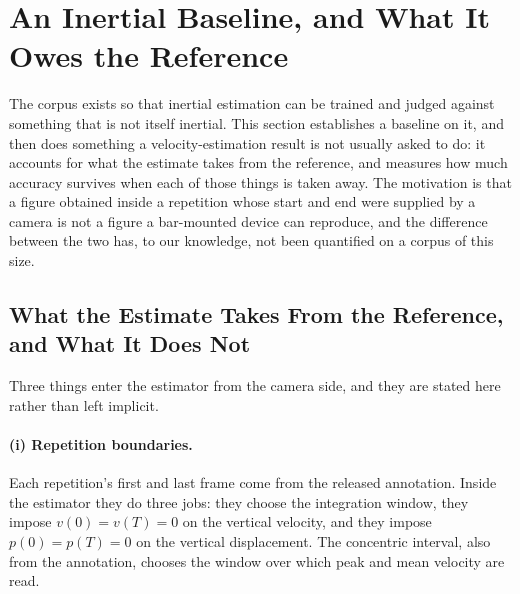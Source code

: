 
\section{An Inertial Baseline, and What It Owes the Reference}\label{sec:imu_baseline}

The corpus exists so that inertial estimation can be trained and judged against something
that is not itself inertial. This section establishes a baseline on it, and then does
something a velocity-estimation result is not usually asked to do: it accounts for what
the estimate takes from the reference, and measures how much accuracy survives when each
of those things is taken away. The motivation is that a figure obtained inside a
repetition whose start and end were supplied by a camera is not a figure a bar-mounted
device can reproduce, and the difference between the two has, to our knowledge, not been
quantified on a corpus of this size.

\subsection{What the Estimate Takes From the Reference, and What It Does Not}
\label{sec:imu_given}

Three things enter the estimator from the camera side, and they are stated here rather
than left implicit.

\paragraph{(i) Repetition boundaries.} Each repetition's first and last frame come from
the released annotation. Inside the estimator they do three jobs: they choose the
integration window, they impose $v(0) = v(T) = 0$ on the vertical velocity, and they
impose $p(0) = p(T) = 0$ on the vertical displacement. The concentric interval, also from
the annotation, chooses the window over which peak and mean velocity are read.

